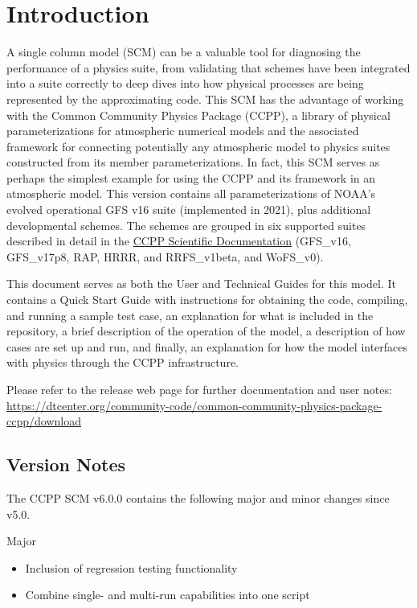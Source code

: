 \chapter{Introduction}
\label{chapter: introduction}

A single column model (SCM) can be a valuable tool for diagnosing the performance of a physics suite, from validating that schemes have been integrated into a suite correctly to deep dives into how physical processes are being represented by the approximating code. This SCM has the advantage of working with the Common Community Physics Package (CCPP), a library of physical parameterizations for atmospheric numerical models and the associated framework for connecting potentially any atmospheric model to physics suites constructed from its member parameterizations. In fact, this SCM serves as perhaps the simplest example for using the CCPP and its framework in an atmospheric model. This version contains all parameterizations of NOAA's evolved operational GFS v16 suite (implemented in 2021), plus additional developmental schemes. The schemes are grouped in six supported suites described in detail in the \href{https://dtcenter.ucar.edu/GMTB/v6.0.0/sci_doc/}{CCPP Scientific Documentation} (GFS\_v16, GFS\_v17p8, RAP, HRRR, and RRFS\_v1beta, and WoFS\_v0).

This document serves as both the User and Technical Guides for this model. It contains a Quick Start Guide with instructions for obtaining the code, compiling, and running a sample test case, an explanation for what is included in the repository, a brief description of the operation of the model, a description of how cases are set up and run, and finally, an explanation for how the model interfaces with physics through the CCPP infrastructure.

Please refer to the release web page for further documentation and user notes:\\ \url{https://dtcenter.org/community-code/common-community-physics-package-ccpp/download}

\section{Version Notes}

The CCPP SCM v6.0.0 contains the following major and minor changes since v5.0.

Major
\begin{itemize}
\item Inclusion of regression testing functionality
\item Combine single- and multi-run capabilities into one script
\end{itemize}

